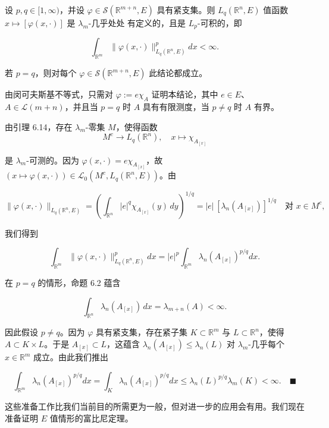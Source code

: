 \begin{corollary}

设 $ p,q \in [1,\infty) $，并设 $ \varphi \in \mathcal{S}(\mathbb{R}^{m+n},E) $ 具有紧支集。则 $ L_q(\mathbb{R}^n,E) $ 值函数 $ x \mapsto [\varphi(x,\cdot)] $ 是 $ \lambda_m $-几乎处处 有定义的，且是 $ L_p $-可积的，即

\[
\int_{\mathbb{R}^m}\|\varphi(x,\cdot)\|_{L_q(\mathbb{R}^n,E)}^p dx < \infty .
\]

若 $ p = q $，则对每个 $ \varphi \in \mathcal{S}(\mathbb{R}^{m+n},E) $ 此结论都成立。

\proofhead
由闵可夫斯基不等式，只需对 $ \varphi := e\chi_A $ 证明本结论，其中 $ e \in E $、$ A \in \mathcal{L}(m+n) $，并且当 $ p = q $ 时 $ A $ 具有有限测度，当 $ p \ne q $ 时 $ A $ 有界。

由引理 6.14，存在 $ \lambda_m $-零集 $ M $，使得函数
\[
M^c \to L_q(\mathbb{R}^n) , \quad x \mapsto \chi_{A_{[x]}}
\]

是 $ \lambda_m $-可测的。因为 $ \varphi(x,\cdot) = e\chi_{A_{[x]}} $，故 $ (x \mapsto \varphi(x,\cdot)) \in \mathcal{L}_0(M^c, L_q(\mathbb{R}^n,E)) $。由

\[
\|\varphi(x,\cdot)\|_{L_q(\mathbb{R}^n,E)} = \left(\int_{\mathbb{R}^n}|e|^q\chi_{A_{[x]}}(y)\,dy\right)^{1/q} = |e|\,[\lambda_n(A_{[x]})]^{1/q} \quad \text{对 } x \in M^c ,
\]

我们得到

\[
\int_{\mathbb{R}^m}\|\varphi(x,\cdot)\|_{L_q(\mathbb{R}^n,E)}^p dx = |e|^p\int_{\mathbb{R}^m}\lambda_n(A_{[x]})^{p/q} dx .
\]

在 $ p = q $ 的情形，命题 6.2 蕴含

\[
\int_{\mathbb{R}^n}\lambda_n(A_{[x]})\,dx = \lambda_{m+n}(A) < \infty .
\]

因此假设 $ p \ne q $。因为 $ \varphi $ 具有紧支集，存在紧子集 $ K \subset \mathbb{R}^m $ 与 $ L \subset \mathbb{R}^n $，使得 $ A \subset K \times L $。于是 $ A_{[x]} \subset L $，这蕴含 $ \lambda_n(A_{[x]}) \le \lambda_n(L) $ 对 $ \lambda_m $-几乎每个 $ x \in \mathbb{R}^m $ 成立。由此我们推出

\[
\int_{\mathbb{R}^m}\lambda_n(A_{[x]})^{p/q} dx = \int_K \lambda_n(A_{[x]})^{p/q} dx \le \lambda_n(L)^{p/q}\lambda_m(K) < \infty .\quad\blacksquare
\]
\end{corollary}

这些准备工作比我们当前目的所需更为一般，但对进一步的应用会有用。我们现在准备证明 $ E $ 值情形的富比尼定理。

